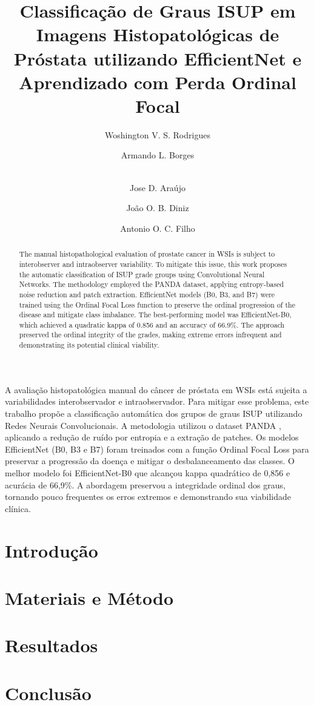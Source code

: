 \documentclass[12pt]{article}
\title{Classificação de Graus ISUP em Imagens Histopatológicas de Próstata utilizando EfficientNet e Aprendizado com Perda Ordinal Focal}
\author{
	Woshington V. S. Rodrigues\inst{1} \and
	Armando L. Borges\inst{2} \and \\
	Jose D. Araújo\inst{2} \and
	João O. B. Diniz\inst{3} \and	
	Antonio O. C. Filho\inst{2}
}
\begin{document}
 

\maketitle

\begin{abstract}
The manual histopathological evaluation of prostate cancer in WSIs is subject to interobserver and intraobserver variability. To mitigate this issue, this work proposes the automatic classification of ISUP grade groups using Convolutional Neural Networks. The methodology employed the PANDA dataset, applying entropy-based noise reduction and patch extraction. EfficientNet models (B0, B3, and B7) were trained using the Ordinal Focal Loss function to preserve the ordinal progression of the disease and mitigate class imbalance. The best-performing model was EfficientNet-B0, which achieved a quadratic kappa of 0.856 and an accuracy of 66.9\%. The approach preserved the ordinal integrity of the grades, making extreme errors infrequent and demonstrating its potential clinical viability.
\end{abstract}
     
\begin{resumo}
A avaliação histopatológica manual do câncer de próstata em WSIs está sujeita a variabilidades interobservador e intraobservador. Para mitigar esse problema, este trabalho propõe a classificação automática dos grupos de graus ISUP utilizando Redes Neurais Convolucionais. A metodologia utilizou o dataset PANDA , aplicando a redução de ruído por entropia e a extração de patches. Os modelos EfficientNet (B0, B3 e B7) foram treinados com a função Ordinal Focal Loss para preservar a progressão da doença e mitigar o desbalanceamento das classes. O melhor modelo foi EfficientNet-B0 que alcançou kappa quadrático de 0,856 e acurácia de 66,9\%. A abordagem preservou a integridade ordinal dos graus, tornando pouco frequentes os erros extremos e demonstrando sua viabilidade clínica.
\end{resumo}


\section{Introdução}


\section{Materiais e Método}
\label{sec:method}


\section{Resultados}
\label{sec:results}


\section{Conclusão}




\end{document}

